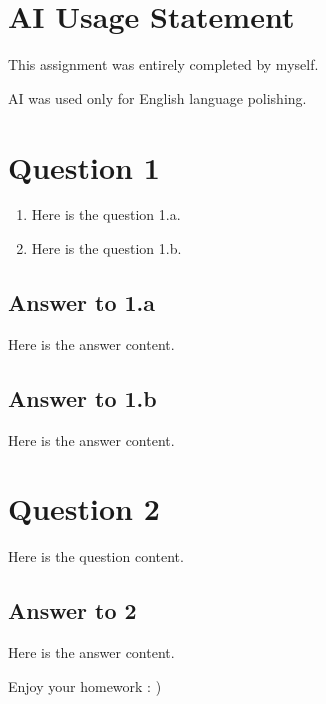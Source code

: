 \documentclass[a4paper]{article}
\begin{document}


\section*{AI Usage Statement}

This assignment was entirely completed by myself.

AI was used only for English language polishing.

\section*{Question 1}

\begin{question}
    \begin{enumerate}
        \item Here is the question 1.a.
        \item Here is the question 1.b.
    \end{enumerate}
\end{question}

\subsection*{Answer to 1.a}

Here is the answer content.

\subsection*{Answer to 1.b}

Here is the answer content.

\section*{Question 2}

\begin{question}
    Here is the question content.
\end{question}

\subsection*{Answer to 2}

Here is the answer content.

Enjoy your homework : )


\end{document}
